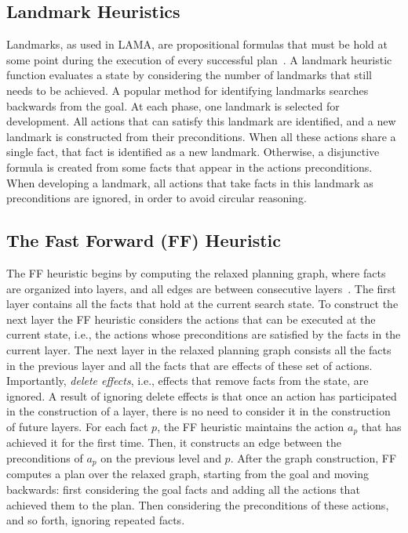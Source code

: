 \documentclass[letterpaper]{article}
\theoremstyle{definition}
\begin{document}
\subsection{Landmark Heuristics}
Landmarks, as used in LAMA, %
are propositional formulas that must be hold at some point during the execution of every successful plan~\citep{richter2008landmarks}. A landmark heuristic function evaluates a state by considering the number of landmarks that still needs to be achieved. A popular method for identifying landmarks searches backwards from the goal. At each phase, one landmark is selected for development. All actions that can satisfy this landmark are identified, and a new landmark is constructed from their preconditions. When all these actions share a single fact, that fact is identified as a new landmark. Otherwise, a disjunctive formula is created from some facts that appear in the actions preconditions. When developing a landmark, all actions that take facts in this landmark as preconditions are ignored, in order to avoid circular reasoning.

\subsection{The Fast Forward (FF) Heuristic}
The FF heuristic begins by computing the relaxed planning graph, where facts are organized into layers, and all edges are between consecutive layers~\citep{hoffmann2001ff}. The first layer contains all the facts that hold at the current search state. To construct the next layer the FF heuristic considers the actions that can be executed at the current state, i.e., the actions whose preconditions are satisfied by the facts in the current layer. The next layer in the relaxed planning graph consists all the facts in the previous layer and all the facts that are effects of these set of actions. Importantly, {\em delete effects}, i.e., effects that remove facts from the state, are ignored. A result of ignoring delete effects
is that once an action has participated in the construction of a layer, there is no need to consider it in the construction of future layers. For each fact $p$, the FF heuristic maintains the action $a_p$ that has achieved it for the first time. Then, it constructs an edge between the preconditions of $a_p$ on the previous level and $p$. After the graph construction, FF computes a plan over the relaxed graph, starting from the goal and moving backwards: first considering the goal facts and adding all the actions that achieved them to the plan. Then considering the preconditions of these actions, and so forth, ignoring repeated facts.
\end{document}
